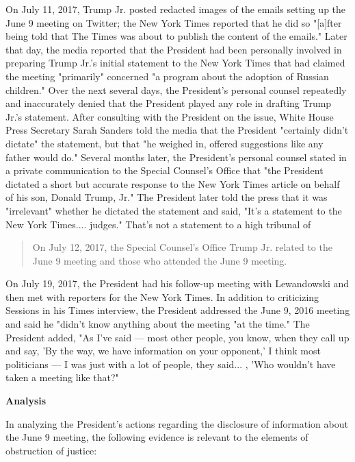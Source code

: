 On July 11, 2017, Trump Jr. posted redacted images of the emails setting up the June 9 meeting on Twitter; the New York Times reported that he did so "[a]fter being told that The Times was about to publish the content of the emails."%
Later that day, the media reported that the President had been personally involved in preparing Trump Jr.'s initial statement to the New York Times that had claimed the meeting "primarily" concerned "a program about the adoption of Russian children."%
Over the next several days, the President's personal counsel repeatedly and inaccurately denied that the President played any role in drafting Trump Jr.'s statement.%
After consulting with the President on the issue, White House Press Secretary Sarah Sanders told the media that the President "certainly didn't dictate" the statement, but that "he weighed in, offered suggestions like any father would do."%
Several months later, the President's personal counsel stated in a private communication to the Special Counsel's Office that "the President dictated a short but accurate response to the New York Times article on behalf of his son, Donald Trump,
Jr."%
The President later told the press that it was "irrelevant" whether he dictated the statement and said, "It's a statement to the New York Times.... judges."%
That's not a statement to a high tribunal of

\begin{quote}
On July 12, 2017, the Special Counsel's Office  Trump Jr.
 related to the June 9 meeting and those who attended the June 9 meeting.%
\end{quote}

On July 19, 2017, the President had his follow-up meeting with Lewandowski and then met with reporters for the New York Times.
In addition to criticizing Sessions in his Times interview, the President addressed the June 9, 2016 meeting and said he "didn't know anything about the meeting "at the time."%
The President added, "As I've said — most other people, you know, when they call up and say, 'By the way, we have information on your opponent,' I think most politicians — I was just with a lot of people, they said... ,
'Who wouldn't have taken a meeting like that?"%

\begin{center}
\textbf{Analysis}
\end{center}

In analyzing the President's actions regarding the disclosure of information about the June 9 meeting, the following evidence is relevant to the elements of obstruction of justice:


